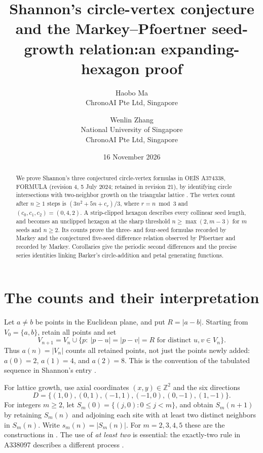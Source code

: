 \documentclass[11pt]{article}
\title{Shannon's circle-vertex conjecture and the\linebreak
Markey--Pfoertner seed-growth relation:\linebreak an expanding-hexagon proof}
\author{Haobo Ma\\\small ChronoAI Pte Ltd, Singapore
\and Wenlin Zhang\\\small National University of Singapore\\\small ChronoAI Pte Ltd, Singapore}
\date{16 November 2026}
\newcommand{\Z}{\mathbb Z}
\newcommand{\card}[1]{\lvert #1\rvert}
\begin{document}
\maketitle
\begin{abstract}
We prove Shannon's three conjectured circle-vertex formulas in OEIS A374338,
FORMULA (revision 4, 5 July 2024; retained in revision 21), by identifying circle
intersections with two-neighbor growth on the triangular lattice
\cite{shannon}. The vertex count after $n\geq1$ steps is
$(3n^2+5n+c_r)/3$, where $r=n\bmod3$ and $(c_0,c_1,c_2)=(0,4,2)$.
A strip-clipped hexagon describes every collinear seed length, and becomes
an unclipped hexagon at the sharp threshold $n\geq\max(2,m-3)$ for $m$ seeds
and $n\geq2$. Its counts prove the three- and four-seed formulas recorded by Markey and
the conjectured five-seed difference relation observed by Pfoertner and
recorded by Markey. Corollaries give the periodic second differences and
the precise series identities linking Barker's circle-addition and petal
generating functions.
\end{abstract}

\section{The counts and their interpretation}
Let $a\ne b$ be points in the Euclidean plane, and put $R=\card{a-b}$.
Starting from $V_0=\{a,b\}$, retain all points and set
\[
 V_{n+1}=V_n\cup\{p:\ \card{p-u}=\card{p-v}=R
                  \text{ for distinct }u,v\in V_n\}.
\]
Thus $a(n)=\card{V_n}$ counts all retained points, not just the points newly
added: $a(0)=2$, $a(1)=4$, and $a(2)=8$.
This is the convention of the tabulated sequence in Shannon's entry
\cite[NAME, DATA, FORMULA]{shannon}.

For lattice growth, use axial coordinates $(x,y)\in\Z^2$ and the six directions
\[
 D=\{(1,0),(0,1),(-1,1),(-1,0),(0,-1),(1,-1)\}.
\]
For integers $m\geq2$, let $S_m(0)=\{(j,0):0\leq j<m\}$, and obtain
$S_m(n+1)$ by retaining $S_m(n)$ and adjoining each site with at least two
distinct neighbors in $S_m(n)$. Write $s_m(n)=\card{S_m(n)}$.
For $m=2,3,4,5$ these are the constructions in
\cite{shannon,three,four,five}. The use of \emph{at least two} is essential:
the exactly-two rule in A338097 describes a different process \cite{sigrist}.
\end{document}
